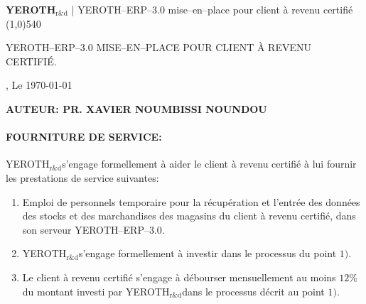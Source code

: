 \documentclass[10pt, a4paper]{article}
\newcommand{\yerothrd}{\textcolor{yerothColorGreen}
			{\textsc{\textcolor{yerothColorRed}{YEROTH}}$_{\text{r\&d}}$\xspace}}
\newcommand{\yerotherptroiszero}{\textsc{YEROTH--ERP--$3.0$}\xspace}
\newcommand{\myfullacademicname}{PR. XAVIER NOUMBISSI NOUNDOU\xspace}
\newcommand{\yerothmiseenplace}{mise--en--place\xspace}
\begin{document}
{\bf \Large \yerothrd} {| \sc \scriptsize \yerotherptroiszero \yerothmiseenplace pour client à
 revenu certifié}
\\ \line(1,0){540}

\vspace{3.5em}


\parbox{27em}{\LARGE \yerotherptroiszero MISE--EN--PLACE POUR CLIENT À REVENU CERTIFIÉ.}

{\hfill \datedayname, Le \today}

\vspace{2.0em}

\begin{center}
\textbf{AUTEUR: \myfullacademicname}
\end{center}

\vspace{2.5em}


\paragraph{FOURNITURE DE SERVICE:\\}
\parbox{36.999em}{
\vspace{1em}
\yerothrd s'engage formellement à aider le client
à revenu certifié à lui fournir les prestations
de service suivantes:\\

\begin{enumerate}[1.]
	\item Emploi de personnels temporaire pour la
		récupération et l'entrée des données
		des stocks et des marchandises des magasins
		du client à revenu certifié, dans son
		serveur \textcolor{yerothColorGreen}{\yerotherptroiszero}.
		
	\item \yerothrd s'engage formellement à investir
		dans le processus du point $1)$.
		
	\item Le client à revenu certifié s'engage à
		débourser mensuellement au moins $12\%$ du montant
		investi par \yerothrd dans le processus décrit
		au point $1)$.
\end{enumerate}
}

	
\end{document}
